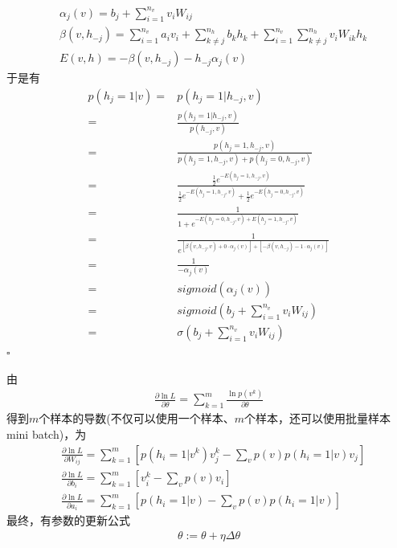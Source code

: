 {\begin{remark}
            \begin{align*}
            & \alpha_j(v) = b_j + \sum_{i = 1}^{n_v}v_i W_{ij}\\
            & \beta(v,h_{-j}) = \sum_{i=1}^{n_v}a_iv_i + \sum_{k\neq j}^{n_h}b_kh_k+\sum_{i=1}^{n_v}\sum_{k\neq j}^{n_h}v_i W_{ik}h_k\\
            & E(v,h) = -\beta(v,h_{-j}) - h_{-j}\alpha_j(v)
            \end{align*}
            于是有
            \begin{align*}
            p(h_j = 1|v)={}& p(h_j=1|h_{-j},v)\\
            ={}& \frac{p(h_j = 1|h_{-j},v)}{p(h_{-j},v)}\\
            ={}& \frac{p(h_j=1,h_{-j},v)}{p(h_j  =1,h_{-j},v)+ p(h_j  =0,h_{-j},v)}\\
            ={}& \frac{\frac{1}{2}e^{-E(h_j=1,h_{-j},v)}}{\frac{1}{2}e^{-E(h_j=1,h_{-j},v)} + \frac{1}{2}e^{-E(h_j=0,h_{-j},v)}}\\
            ={}& \frac{1}{1+ e^{- E(h_j=0,h_{-j},v)+ E(h_j=1,h_{-j},v)}}\\
            ={}& \frac{1}{e^{[\beta(v,h_{-j},v)+ 0\cdot \alpha _j(v)] + [-\beta(v,h_{-j}) - 1\cdot \alpha_j(v)]}}\\
            ={}& \frac{1}{-\alpha_j(v)}\\
            ={}& sigmoid(\alpha_j(v))\\
            ={}& sigmoid \left( b_j + \sum_{i=1}^{n_v}v_iW_{ij} \right) \\
            ={}& \sigma \left( b_j + \sum_{i=1}^{n_v}v_iW_{ij} \right)
            \end{align*}
            $\square$
            \end{remark}
            \par
            由
            \begin{align*}
            \frac{\partial \ln L}{\partial \theta} = \sum_{k=1}^m\frac{\ln p(v^k)}{\partial \theta}
            \end{align*}
            得到$m$个样本的导数(不仅可以使用一个样本、$m$个样本，还可以使用批量样本mini batch)，为
            \begin{align*}
            &\frac{\partial \ln L}{\partial W_{ij}} = \sum_{k=1}^m \left[ p(h_i=1|v^k)v_j^k - \sum_vp(v)p(h_i = 1|v)v_j \right]\\
            &\frac{\partial \ln L}{\partial b_i} = \sum_{k=1}^m \left[ v_i^k- \sum_vp(v)v_i \right]\\
            &\frac{\partial \ln L}{\partial a_i} = \sum_{k=1}^m \left[  p(h_i=1|v) - \sum_vp(v)p(h_i=1|v) \right]
            \end{align*}
            最终，有参数的更新公式
            \begin{align*}
            \theta :=\theta + \eta\Delta\theta
            \end{align*}

}
